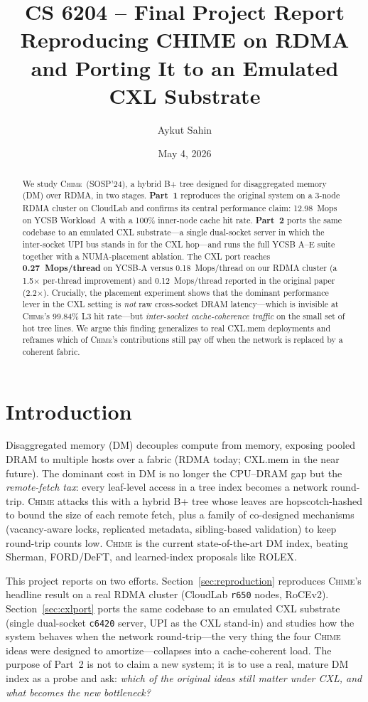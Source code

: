 \documentclass[11pt]{article}
\title{CS 6204 -- Final Project Report \\ Reproducing CHIME on RDMA and Porting It to an Emulated CXL Substrate}
\author{Aykut Sahin}
\date{May 4, 2026}
\begin{document}
\maketitle

\begin{abstract}
\noindent We study \textsc{Chime}~(SOSP'24), a hybrid B+ tree designed for disaggregated memory (DM) over RDMA, in two stages. \textbf{Part~1} reproduces the original system on a 3-node RDMA cluster on CloudLab and confirms its central performance claim: 12.98~Mops on YCSB Workload~A with a 100\% inner-node cache hit rate. \textbf{Part~2} ports the same codebase to an emulated CXL substrate---a single dual-socket server in which the inter-socket UPI bus stands in for the CXL hop---and runs the full YCSB A--E suite together with a NUMA-placement ablation. The CXL port reaches \textbf{0.27~Mops/thread} on YCSB-A versus 0.18~Mops/thread on our RDMA cluster (a 1.5$\times$ per-thread improvement) and 0.12~Mops/thread reported in the original paper (2.2$\times$). Crucially, the placement experiment shows that the dominant performance lever in the CXL setting is \emph{not} raw cross-socket DRAM latency---which is invisible at \textsc{Chime}'s 99.84\% L3 hit rate---but \emph{inter-socket cache-coherence traffic} on the small set of hot tree lines. We argue this finding generalizes to real CXL.mem deployments and reframes which of \textsc{Chime}'s contributions still pay off when the network is replaced by a coherent fabric.
\end{abstract}

\section{Introduction}
Disaggregated memory (DM) decouples compute from memory, exposing pooled DRAM to multiple hosts over a fabric (RDMA today; CXL.mem in the near future). The dominant cost in DM is no longer the CPU--DRAM gap but the \emph{remote-fetch tax}: every leaf-level access in a tree index becomes a network round-trip. \textsc{Chime} attacks this with a hybrid B+ tree whose leaves are hopscotch-hashed to bound the size of each remote fetch, plus a family of co-designed mechanisms (vacancy-aware locks, replicated metadata, sibling-based validation) to keep round-trip counts low. \textsc{Chime} is the current state-of-the-art DM index, beating Sherman, FORD/DeFT, and learned-index proposals like ROLEX.

This project reports on two efforts. Section~\ref{sec:reproduction} reproduces \textsc{Chime}'s headline result on a real RDMA cluster (CloudLab \texttt{r650} nodes, RoCEv2). Section~\ref{sec:cxlport} ports the same codebase to an emulated CXL substrate (single dual-socket \texttt{c6420} server, UPI as the CXL stand-in) and studies how the system behaves when the network round-trip---the very thing the four \textsc{Chime} ideas were designed to amortize---collapses into a cache-coherent load. The purpose of Part~2 is not to claim a new system; it is to use a real, mature DM index as a probe and ask: \emph{which of the original ideas still matter under CXL, and what becomes the new bottleneck?}
\end{document}
